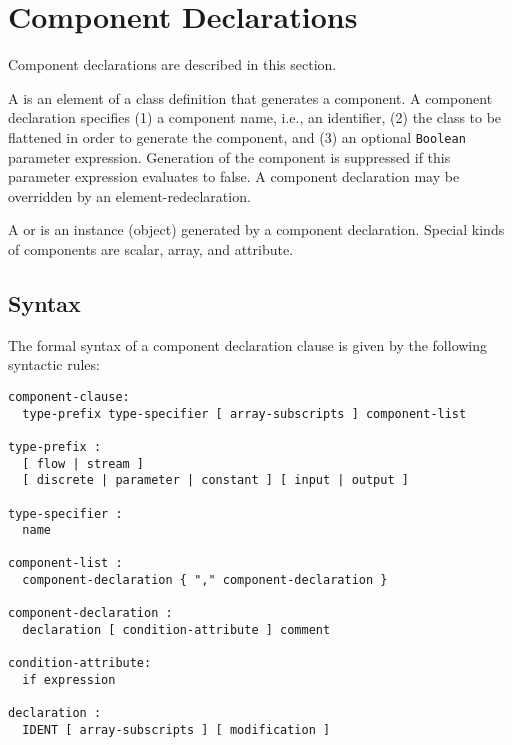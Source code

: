 \section{Component Declarations}\label{component-declarations}

Component declarations are described in this section.

A  is an element of a class definition that generates a component.
A component declaration specifies (1) a component name, i.e., an identifier, (2) the class to be flattened in order to generate the component, and (3) an optional \lstinline!Boolean! parameter expression.
Generation of the component is suppressed if this parameter expression evaluates to false.
A component declaration may be overridden by an element-redeclaration.

A  or  is an instance (object) generated by a component declaration.
Special kinds of components are scalar, array, and attribute.

\subsection{Syntax}\label{component-declaration-syntax}\label{syntax-and-examples-of-component-declarations}

The formal syntax of a component declaration clause is given by the following syntactic rules:
\begin{lstlisting}[language=grammar]
component-clause:
  type-prefix type-specifier [ array-subscripts ] component-list

type-prefix :
  [ flow | stream ]
  [ discrete | parameter | constant ] [ input | output ]

type-specifier :
  name

component-list :
  component-declaration { "," component-declaration }

component-declaration :
  declaration [ condition-attribute ] comment

condition-attribute:
  if expression

declaration :
  IDENT [ array-subscripts ] [ modification ]
\end{lstlisting}

